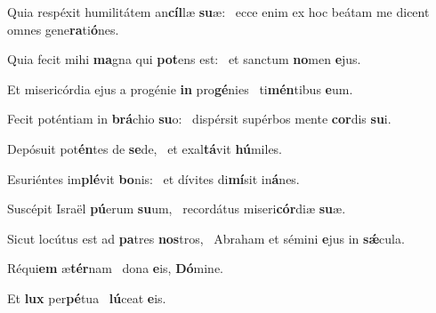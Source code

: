 \item Quia respéxit humilitátem an\textbf{cíl}læ \textbf{su}æ:~\psstar{} ecce enim ex hoc beátam me dicent omnes gene\textbf{ra}ti\textbf{ó}nes.

\item Quia fecit mihi \textbf{ma}gna qui \textbf{pot}ens est:~\psstar{} et sanctum \textbf{no}men \textbf{e}jus.

\item Et misericórdia ejus a progénie \textbf{in} pro\textbf{gé}nies~\psstar{} ti\textbf{mén}tibus \textbf{e}um.

\item Fecit poténtiam in \textbf{brá}chio \textbf{su}o:~\psstar{} dispérsit supérbos mente \textbf{cor}dis \textbf{su}i.

\item Depósuit pot\textbf{én}tes de \textbf{se}de,~\psstar{} et exal\textbf{tá}vit \textbf{hú}miles.

\item Esuriéntes im\textbf{plé}vit \textbf{bo}nis:~\psstar{} et dívites di\textbf{mí}sit in\textbf{á}nes.

\item Suscépit Israël \textbf{pú}erum \textbf{su}um,~\psstar{} recordátus miseri\textbf{cór}diæ \textbf{su}æ.

\item Sicut locútus est ad \textbf{pa}tres \textbf{nos}tros,~\psstar{} Abraham et sémini \textbf{e}jus in \textbf{sǽ}cula.

\item Réqui\textbf{em} æ\textbf{tér}nam~\psstar{} dona \textbf{e}is, \textbf{Dó}mine.

\item Et \textbf{lux} per\textbf{pé}tua~\psstar{} \textbf{lú}ceat \textbf{e}is.